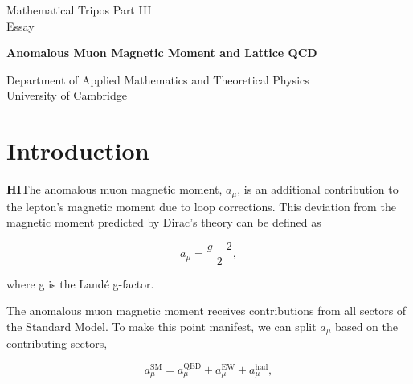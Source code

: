\documentclass{article}
\numberwithin{equation}{section} %
\begin{document}
\begin{titlepage}
\begin{center}
\vspace*{1cm}
Mathematical Tripos Part III\\Essay
\vspace{0.5cm}

{\LARGE \textbf{Anomalous Muon Magnetic Moment and Lattice QCD}}
\vspace{3cm}

\vspace{1cm}
\vspace{7cm}
Department of Applied Mathematics and Theoretical Physics\\
University of Cambridge\\


\end{center}
\end{titlepage}

\newcommand{\amu}{$a_\mu$ }

\tableofcontents

\newpage

\section{Introduction}\label{intro}
\textbf{HI}The anomalous muon magnetic moment, $a_\mu$, is an additional contribution to the lepton's magnetic moment due to loop corrections. This deviation from the magnetic moment predicted by Dirac's theory can be defined as\cite{lehnerg2}

\begin{equation}
a_\mu = \frac{g-2}{2},
\label{amu}
\end{equation}

\noindent where g is the Land\'e g-factor.  

The anomalous muon magnetic moment receives contributions from all sectors of the Standard Model. To make this point manifest, we can split \amu based on the contributing sectors\cite{hoecker},

\begin{equation}
a^{\mathrm{SM}}_\mu= a_\mu^{\mathrm{QED}} + a_\mu^{\mathrm{EW}} + a_\mu^{\mathrm{had}},
\label{asm}
\end{equation}
\end{document}
